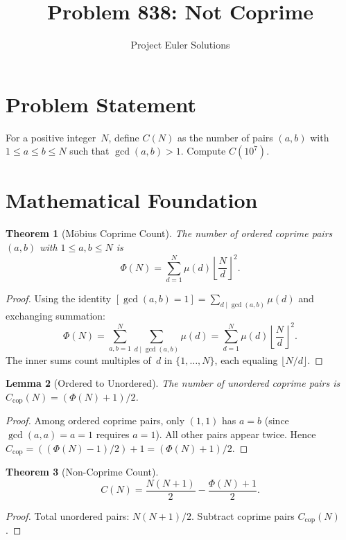\documentclass[11pt]{article}
\title{Problem 838: Not Coprime}
\author{Project Euler Solutions}
\date{}
\newtheorem{theorem}{Theorem}
\newtheorem{lemma}[theorem]{Lemma}
\begin{document}
\maketitle

\section{Problem Statement}

For a positive integer~$N$, define $C(N)$ as the number of pairs $(a,b)$ with $1\le a\le b\le N$ such that $\gcd(a,b)>1$. Compute $C(10^7)$.

\section{Mathematical Foundation}

\begin{theorem}[M\"obius Coprime Count]
The number of ordered coprime pairs $(a,b)$ with $1\le a,b\le N$ is
\[
\Phi(N) = \sum_{d=1}^{N}\mu(d)\left\lfloor\frac{N}{d}\right\rfloor^2.
\]
\end{theorem}

\begin{proof}
Using the identity $[\gcd(a,b)=1]=\sum_{d\mid\gcd(a,b)}\mu(d)$ and exchanging summation:
\[
\Phi(N) = \sum_{a,b=1}^{N}\sum_{d\mid\gcd(a,b)}\mu(d) = \sum_{d=1}^{N}\mu(d)\left\lfloor\frac{N}{d}\right\rfloor^2.
\]
The inner sums count multiples of~$d$ in $\{1,\ldots,N\}$, each equaling $\lfloor N/d\rfloor$.
\end{proof}

\begin{lemma}[Ordered to Unordered]
The number of unordered coprime pairs is $C_{\mathrm{cop}}(N)=(\Phi(N)+1)/2$.
\end{lemma}

\begin{proof}
Among ordered coprime pairs, only $(1,1)$ has $a=b$ (since $\gcd(a,a)=a=1$ requires $a=1$). All other pairs appear twice. Hence $C_{\mathrm{cop}}=((\Phi(N)-1)/2)+1=(\Phi(N)+1)/2$.
\end{proof}

\begin{theorem}[Non-Coprime Count]
\[
C(N) = \frac{N(N+1)}{2} - \frac{\Phi(N)+1}{2}.
\]
\end{theorem}

\begin{proof}
Total unordered pairs: $N(N+1)/2$. Subtract coprime pairs $C_{\mathrm{cop}}(N)$.
\end{proof}
\end{document}

